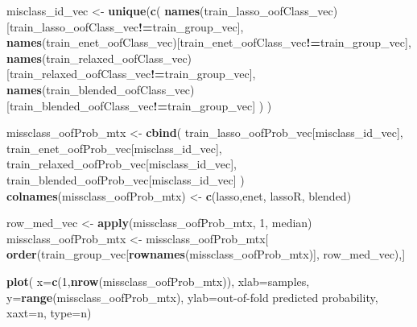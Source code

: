 \documentclass[
]{book}
\newenvironment{Shaded}{\begin{snugshade}}{\end{snugshade}}
\newcommand{\DataTypeTok}[1]{\textcolor[rgb]{0.13,0.29,0.53}{#1}}
\newcommand{\DecValTok}[1]{\textcolor[rgb]{0.00,0.00,0.81}{#1}}
\newcommand{\KeywordTok}[1]{\textcolor[rgb]{0.13,0.29,0.53}{\textbf{#1}}}
\newcommand{\NormalTok}[1]{#1}
\newcommand{\OperatorTok}[1]{\textcolor[rgb]{0.81,0.36,0.00}{\textbf{#1}}}
\newcommand{\StringTok}[1]{\textcolor[rgb]{0.31,0.60,0.02}{#1}}
\begin{document}
\begin{Shaded}
\begin{Highlighting}[]
\NormalTok{misclass\_id\_vec <{-}}\StringTok{ }\KeywordTok{unique}\NormalTok{(}\KeywordTok{c}\NormalTok{(}
 \KeywordTok{names}\NormalTok{(train\_lasso\_oofClass\_vec)[train\_lasso\_oofClass\_vec}\OperatorTok{!=}\NormalTok{train\_group\_vec],}
 \KeywordTok{names}\NormalTok{(train\_enet\_oofClass\_vec)[train\_enet\_oofClass\_vec}\OperatorTok{!=}\NormalTok{train\_group\_vec],}
 \KeywordTok{names}\NormalTok{(train\_relaxed\_oofClass\_vec)[train\_relaxed\_oofClass\_vec}\OperatorTok{!=}\NormalTok{train\_group\_vec],}
 \KeywordTok{names}\NormalTok{(train\_blended\_oofClass\_vec)[train\_blended\_oofClass\_vec}\OperatorTok{!=}\NormalTok{train\_group\_vec]}
\NormalTok{ )}
\NormalTok{)}


\NormalTok{missclass\_oofProb\_mtx <{-}}\StringTok{ }\KeywordTok{cbind}\NormalTok{(}
\NormalTok{ train\_lasso\_oofProb\_vec[misclass\_id\_vec],}
\NormalTok{ train\_enet\_oofProb\_vec[misclass\_id\_vec],}
\NormalTok{ train\_relaxed\_oofProb\_vec[misclass\_id\_vec],}
\NormalTok{ train\_blended\_oofProb\_vec[misclass\_id\_vec]}
\NormalTok{)}
\KeywordTok{colnames}\NormalTok{(missclass\_oofProb\_mtx) <{-}}\StringTok{ }\KeywordTok{c}\NormalTok{(}\StringTok{\textquotesingle{}lasso\textquotesingle{}}\NormalTok{,}\StringTok{\textquotesingle{}enet\textquotesingle{}}\NormalTok{, }\StringTok{\textquotesingle{}lassoR\textquotesingle{}}\NormalTok{, }\StringTok{\textquotesingle{}blended\textquotesingle{}}\NormalTok{)}

\NormalTok{row\_med\_vec <{-}}\StringTok{ }\KeywordTok{apply}\NormalTok{(missclass\_oofProb\_mtx, }\DecValTok{1}\NormalTok{, median)}
\NormalTok{missclass\_oofProb\_mtx <{-}}\StringTok{ }\NormalTok{missclass\_oofProb\_mtx[}
  \KeywordTok{order}\NormalTok{(train\_group\_vec[}\KeywordTok{rownames}\NormalTok{(missclass\_oofProb\_mtx)], row\_med\_vec),]}

\KeywordTok{plot}\NormalTok{(}
 \DataTypeTok{x=}\KeywordTok{c}\NormalTok{(}\DecValTok{1}\NormalTok{,}\KeywordTok{nrow}\NormalTok{(missclass\_oofProb\_mtx)), }\DataTypeTok{xlab=}\StringTok{\textquotesingle{}samples\textquotesingle{}}\NormalTok{,}
 \DataTypeTok{y=}\KeywordTok{range}\NormalTok{(missclass\_oofProb\_mtx), }\DataTypeTok{ylab=}\StringTok{\textquotesingle{}out{-}of{-}fold predicted probability\textquotesingle{}}\NormalTok{,}
 \DataTypeTok{xaxt=}\StringTok{\textquotesingle{}n\textquotesingle{}}\NormalTok{, }\DataTypeTok{type=}\StringTok{\textquotesingle{}n\textquotesingle{}}\NormalTok{)}


\end{Highlighting}
\end{Shaded}
\end{document}
